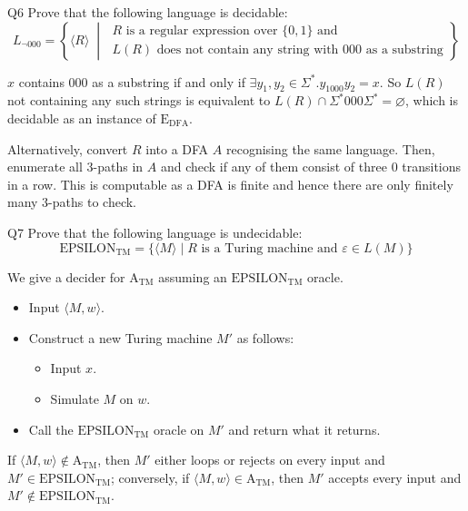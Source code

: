 \documentclass{article}
\theoremstyle{definition}
\theoremstyle{definition}
\theoremstyle{remark}
\begin{document}
\begin{questionbox}{Q6}
    Prove that the following language is decidable:
    \begin{equation*}
        L_{\lnot000}=\left\{\langle R\rangle\;\middle|\;\begin{gathered}
            R\text{ is a regular expression over }\{0,1\}\text{ and }\\
            L(R)\text{ does not contain any string with }000\text{ as a substring}
        \end{gathered}
        \right\}
    \end{equation*}
\end{questionbox}

\bigskip

$x$ contains $000$ as a substring if and only if $\exists y_1,y_2\in\Sigma^\ast.y_1000y_2=x$. So $L(R)$ not containing any such strings is equivalent to $L(R)\cap\Sigma^\ast000\Sigma^\ast=\varnothing$, which is decidable as an instance of $\text{E}_\text{DFA}$.

Alternatively, convert $R$ into a DFA $A$ recognising the same language. Then, enumerate all $3$-paths in $A$ and check if any of them consist of three $0$ transitions in a row. This is computable as a DFA is finite and hence there are only finitely many $3$-paths to check.







\begin{questionbox}{Q7}
    Prove that the following language is undecidable:
    \begin{equation*}
        \text{EPSILON}_\text{TM}=\bigl\{\langle M\rangle\mid R\text{ is a Turing machine and }\varepsilon\in L(M)\bigr\}
    \end{equation*}
\end{questionbox}

\bigskip

We give a decider for $\text{A}_\text{TM}$ assuming an $\text{EPSILON}_\text{TM}$ oracle.
\begin{itemize}
    \item[(1)] Input $\langle M,w\rangle$.
    \item[(2)] Construct a new Turing machine $M'$ as follows:
    \begin{itemize}
        \item Input $x$.
        \item Simulate $M$ on $w$.
    \end{itemize}
    \item[(3)] Call the $\text{EPSILON}_\text{TM}$ oracle on $M'$ and return what it returns.
\end{itemize}
If $\langle M,w\rangle\notin\text{A}_\text{TM}$, then $M'$ either loops or rejects on every input and $M'\in\text{EPSILON}_\text{TM}$; conversely, if $\langle M,w\rangle\in\text{A}_\text{TM}$, then $M'$ accepts every input and $M'\notin\text{EPSILON}_\text{TM}$.
\end{document}
